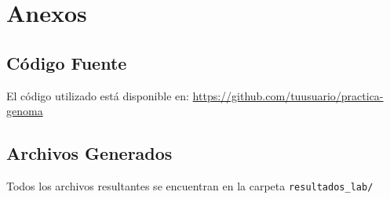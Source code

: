 \documentclass[12pt, a4paper]{article}
\begin{document}
\section*{Anexos}

\subsection*{Código Fuente}
El código utilizado está disponible en: \url{https://github.com/tuusuario/practica-genoma}

\subsection*{Archivos Generados}
Todos los archivos resultantes se encuentran en la carpeta \texttt{resultados\_lab/}
\end{document}
